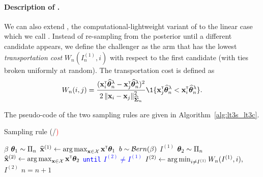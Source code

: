 \paragraph{Description of \LTCC{}.} We can also extend \TCC{}, the computational-lightweight variant of \TTTS{} to the linear case which we call \LTCC{}. Instead of re-sampling from the posterior until a different candidate appears, we define the challenger as the arm that has the lowest \emph{transportation cost} $W_n(I_n^{(1)},i)$ with respect to the first candidate (with ties broken uniformly at random). The transportation cost is defined as
\begin{align}\label{def:transportation}
    W_n(i,j) = \dfrac{(\bx_i\transpose\hat{\btheta}^\lambda_n-\bx_j\transpose\hat{\btheta}^\lambda_n)^2}{2\normm{\bx_i-\bx_j}_{\hat{\bSigma}_n}^2}\1\{\bx_j\transpose\hat{\btheta}^\lambda_n<\bx_i\transpose\hat{\btheta}^\lambda_n\}.
\end{align}

The pseudo-code of the two sampling rules are given in Algorithm~\ref{alg:lt3s_lt3c}.

\begin{algorithm}[ht]
\centering
\caption{Sampling rule (\textcolor{blue}{\LTCS{}}/\textcolor{red}{\LTCC{})}}
\label{alg:lt3s_lt3c}
\begin{algorithmic}[1]
    $\beta$ %
        \State {} ${\boldsymbol \theta}_1 \sim \Pi_n$
        \State $\widehat{{\bf x}}^{(1)} \leftarrow \operatorname*{arg\,max}_{{\bf x}\in\mathcal{X}} {\bf x}^\mathsf{\scriptscriptstyle T}{\boldsymbol \theta}_1$ 
	    \State {} $b \sim \mathcal{B} ern(\beta)$
	        \State {} $I^{(1)}$
	    \Else
	        \State \textcolor{blue}{ ${\boldsymbol \theta}_2 \sim \Pi_n$}%
            \State \textcolor{blue}{$\widehat{{\bf x}}^{(2)} \leftarrow \operatorname*{arg\,max}_{{\bf x}\in\mathcal{X}} {\bf x}^\mathsf{\scriptscriptstyle T}{\boldsymbol \theta}_2$ }\Comment{\textcolor{blue}{\LTCS}}
	        \State \textcolor{blue}{\texttt{until} $I^{(2)} \neq I^{(1)}$}%
	        \State \textcolor{red}{$I^{(2)} \leftarrow \operatorname*{arg\,min}_{i\neq I^{(1)}}W_n(I^{(1)},i), $ }\Comment{\textcolor{red}{\LTCC}}%
		    \State {} $I^{(2)}$
	    \EndIf
	    \State {}
	    \State $n = n+1$
   \EndFor
\end{algorithmic}
\end{algorithm}

